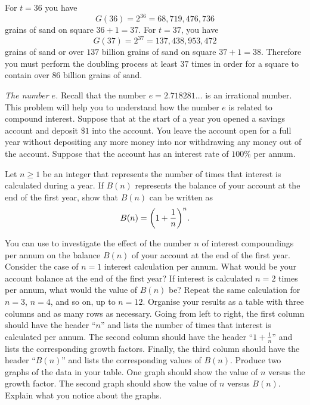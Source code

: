 \documentclass[a4paper,oneside,12pt]{article}
\begin{document}
\begin{problem}
{\begin{solution}
For $t = 36$ you have
\[
G(36)
=
2^{36}
=
68,719,476,736
\]
grains of sand on square $36 + 1 = 37$.  For $t = 37$, you have
\[
G(37)
=
2^{37}
=
137,438,953,472
\]
grains of sand or over $137$ billion grains of sand on square
$37 + 1 = 38$.  Therefore you must perform the doubling process at
least $37$ times in order for a square to contain over $86$ billion
grains of sand.
\end{solution}
}{}

\item\label{prob:exponential:number_e}
  \emph{The number $e$.}
  Recall that the number $e = 2.718281\dots$ is an irrational number.
  This problem will help you to understand how the number $e$ is
  related to compound interest.  Suppose that at the start of a year
  you opened a savings account and deposit $\$1$ into the account.
  You leave the account open for a full year without depositing any
  more money into nor withdrawing any money out of the account.
  Suppose that the account has an interest rate of $100\%$ per annum.
  \begin{packedenum}
  \item\label{subprob:exponential:e_balance_formula}
    Let $n \geq 1$ be an integer that represents the number of times
    that interest is calculated during a year.  If $B(n)$ represents
    the balance of your account at the end of the first year, show
    that $B(n)$ can be written as
    \begin{equation}
    \label{eqn:exponential:e_savings_first_year_n_compounding}
    B(n)
    =
    \parenthesis*{
      1 + \frac{1}{n}
    }^n.
    \end{equation}

  \item\label{subprob:exponential:e_balance_up_to_12_compounding}
    You can use
     to
    investigate the effect of the number $n$ of interest compoundings
    per annum on the balance $B(n)$ of your account at the end of the
    first year.  Consider the case of $n = 1$ interest calculation per
    annum.  What would be your account balance at the end of the first
    year?  If interest is calculated $n = 2$ times per annum, what
    would the value of $B(n)$ be?  Repeat the same calculation for
    $n = 3$, $n = 4$, and so on, up to $n = 12$.  Organise your
    results as a table with three columns and as many rows as
    necessary.  Going from left to right, the first column should have
    the header ``$n$'' and lists the number of times that interest is
    calculated per annum.  The second column should have the header
    ``$1 + \frac{1}{n}$'' and lists the corresponding growth factors.
    Finally, the third column should have the header ``$B(n)$'' and
    lists the corresponding values of $B(n)$.  Produce two graphs of
    the data in your table.  One graph should show the value of $n$
    versus the growth factor.  The second graph should show the value
    of $n$ versus $B(n)$.  Explain what you notice about the graphs.


\end{packedenum}
\end{problem}
\end{document}
